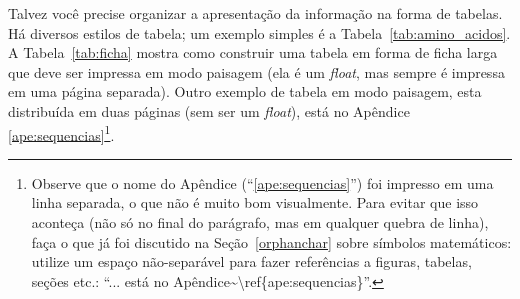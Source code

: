 Talvez você precise organizar a apresentação da informação na forma de
tabelas. Há diversos estilos de tabela; um exemplo simples é a
Tabela~\ref{tab:amino_acidos}. A Tabela~\ref{tab:ficha} mostra como construir
uma tabela em forma de ficha larga que deve ser impressa em modo paisagem (ela
é um \textit{float}, mas sempre é impressa em uma página separada). Outro
exemplo de tabela em modo paisagem, esta distribuída em duas páginas (sem ser
um \textit{float}), está no Apêndice \ref{ape:sequencias}\footnote{
Observe que o nome do Apêndice (``\ref{ape:sequencias}'') foi impresso em uma
linha separada, o que não é muito bom visualmente. Para evitar que isso
aconteça (não só no final do parágrafo, mas em qualquer quebra de linha),
faça o que já foi discutido na Seção~\ref{orphanchar} sobre símbolos
matemáticos: utilize um espaço não-separável para fazer referências a
figuras, tabelas, seções etc.: ``\textsf{... está no
Apêndice\textasciitilde\textbackslash{}ref\{ape:sequencias\}}''.}.

